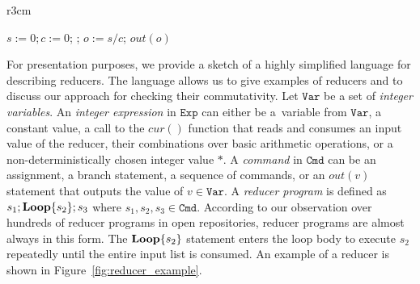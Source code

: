 \documentclass{llncs}
\newcommand{\Var}{\mathtt{Var}}
\newcommand{\Exp}{\mathtt{Exp}}
\newcommand{\Cmd}{\mathtt{Cmd}}
\newcommand{\cur}{cur()}
\newcommand{\rloop}{
	\ifmmode
	\mathbf{Loop}
	\else
	\textbf{Loop}
	\fi}
\begin{document}
\begin{wrapfigure}{r}{3cm}
		\vspace{-0.8cm}

	
	\begin{minipage}{0.3\textwidth}
		\begin{algorithm}[H]
			$s := 0;c:=0$; \;
			\Loop{}{
				$s := s+\cur$;\;
				$c := c+1$
			};
			$o := s/c$;\;
			$out(o)$\;
		\end{algorithm}
	\end{minipage}


	\caption{A reducer that computes the average value.}
	\vspace{-0.8cm}
	\label{fig:reducer_example}
\end{wrapfigure}

For presentation purposes, we provide a sketch of a highly simplified language
for describing reducers. The language allows us to give examples of reducers and
to discuss our approach for checking their commutativity. Let $\Var$ be a set of
\emph{integer variables}. An \emph{integer expression} in $\Exp$ can either be
a~variable from $\Var$, a constant value, a call to the $\cur$ function that
reads and consumes an input value of the reducer, their combinations over basic
arithmetic operations, or a non-deterministically chosen integer value $*$. A
\emph{command} in $\Cmd$ can be an assignment, a branch statement, a sequence of
commands, or an $out(v)$ statement that outputs the value of $v \in \Var$. A
\emph{reducer program} is defined as $s_1;\rloop\{s_2\};s_3$ where $s_1,s_2,s_3
\in \Cmd$. According to our observation over hundreds  of reducer programs in
open repositories, reducer programs are almost always in this form. The
$\rloop\{s_2\}$ statement enters the loop body to execute $s_2$ repeatedly until
the entire input list is consumed. An example of a reducer is shown in
Figure~\ref{fig:reducer_example}.
\end{document}
